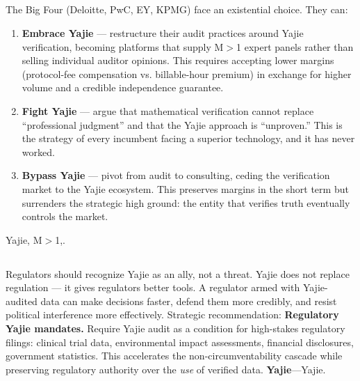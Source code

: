 \documentclass[12pt,a4paper]{article}
\theoremstyle{remark}
\begin{document}
\subsection{}
The Big Four (Deloitte, PwC, EY, KPMG) face an existential choice. They can:
\begin{enumerate}[label= \arabic*, leftmargin=*]
 \item \textbf{Embrace Yajie} --- restructure their audit practices around Yajie 
 verification, becoming platforms that supply M$>$1 expert panels rather than 
 selling individual auditor opinions. This requires accepting lower margins 
 (protocol-fee compensation vs. billable-hour premium) in exchange for higher 
 volume and a credible independence guarantee.
 \item \textbf{Fight Yajie} --- argue that mathematical verification cannot replace 
 ``professional judgment'' and that the Yajie approach is ``unproven.'' This 
 is the strategy of every incumbent facing a superior technology, and it has 
 never worked.
 \item \textbf{Bypass Yajie} --- pivot from audit to consulting, ceding the verification 
 market to the Yajie ecosystem. This preserves margins in the short term but 
 surrenders the strategic high ground: the entity that verifies truth eventually 
 controls the market.
\end{enumerate}
\medskip
Yajie, M$>$1,.
\subsection{}
Regulators should recognize Yajie as an ally, not a threat. Yajie does not replace 
regulation --- it gives regulators better tools. A regulator armed with Yajie-audited 
data can make decisions faster, defend them more credibly, and resist political 
interference more effectively.
Strategic recommendation: \textbf{Regulatory Yajie mandates.} Require Yajie audit as a 
condition for high-stakes regulatory filings: clinical trial data, environmental impact 
assessments, financial disclosures, government statistics. This accelerates the 
non-circumventability cascade while preserving regulatory authority over the \textit{use} 
of verified data.
\medskip
\textbf{Yajie}---Yajie.
\end{document}
